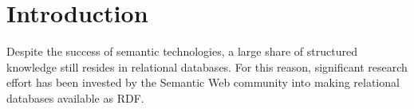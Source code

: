 
\section{Introduction}

Despite the success of semantic technologies, a large share of structured knowledge still resides in relational databases.
For this reason, significant research effort has been invested by the Semantic Web community into making relational databases available as RDF.


